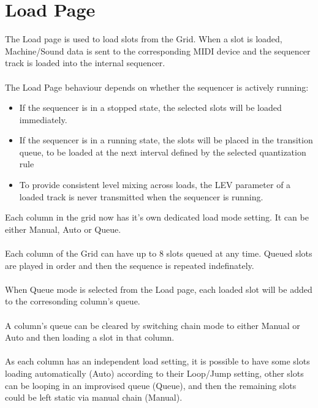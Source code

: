 \chapter{Load Page}
The Load page is used to load slots from the Grid. When a slot is loaded, Machine/Sound data is sent to the corresponding MIDI device and the sequencer track is loaded into the internal sequencer.\\
\\
The Load Page behaviour depends on whether the sequencer is actively running:
\begin{itemize}
    \item If the sequencer is in a stopped state, the selected slots will be loaded immediately.
    \item If the sequencer is in a running state, the slots will be placed in the transition queue, to be loaded at the next interval defined by the selected quantization rule
    \item To provide consistent level mixing across loads, the LEV parameter of a loaded track is never transmitted when the sequencer is running. 
\end{itemize}
 Each column in the grid now has it's own dedicated load mode setting. It can be either Manual, Auto or Queue.\\
\\
 Each column of the Grid can have up to 8 slots queued at any time. Queued slots are played in order
 and then the sequence is repeated indefinately.\\\\

 When Queue mode is selected from the Load page, each loaded slot will be added to the corresonding column's
 queue.\\\\
 
 A column's queue can be cleared by switching chain mode to either Manual or Auto and then loading a slot in
 that column.\\\\

 As each column has an independent load setting, it is possible to have some slots loading automatically
 (Auto) according to their Loop/Jump setting, other slots can be looping in an improvised queue (Queue),
 and then the remaining slots could be left static via manual chain (Manual).

